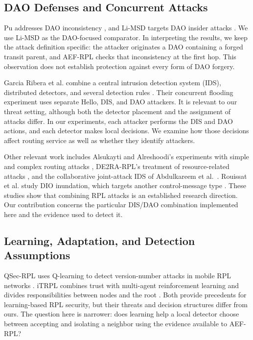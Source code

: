 \documentclass[journal]{IEEEtran}
\begin{document}
\subsection{DAO Defenses and Concurrent Attacks}
Pu addresses DAO inconsistency \cite{pu2018}, and Li-MSD targets DAO insider attacks \cite{limsd2024}. We use Li-MSD as the DAO-focused comparator. In interpreting the results, we keep the attack definition specific: the attacker originates a DAO containing a forged transit parent, and AEF-RPL checks that inconsistency at the first hop. This observation does not establish protection against every form of DAO forgery.

Garcia Ribera et al. combine a central intrusion detection system (IDS), distributed detectors, and several detection rules \cite{garciaribera2022}. Their concurrent flooding experiment uses separate Hello, DIS, and DAO attackers. It is relevant to our threat setting, although both the detector placement and the assignment of attacks differ. In our experiments, each attacker performs the DIS and DAO actions, and each detector makes local decisions. We examine how those decisions affect routing service as well as whether they identify attackers.

Other relevant work includes Alsukayti and Alreshoodi's experiments with simple and complex routing attacks \cite{alsukayti2023}, DE2RA-RPL's treatment of resource-related attacks \cite{de2rarpl2024}, and the collaborative joint-attack IDS of Abdulkareem et al.\ \cite{abdulkareem2024}. Rouissat et al. study DIO inundation, which targets another control-message type \cite{rouissat2023}. These studies show that combining RPL attacks is an established research direction. Our contribution concerns the particular DIS/DAO combination implemented here and the evidence used to detect it.

\subsection{Learning, Adaptation, and Detection Assumptions}
QSec-RPL uses Q-learning to detect version-number attacks in mobile RPL networks \cite{qsecrpl2023}. iTRPL combines trust with multi-agent reinforcement learning and divides responsibilities between nodes and the root \cite{itrpl2024}. Both provide precedents for learning-based RPL security, but their threats and decision structures differ from ours. The question here is narrower: does learning help a local detector choose between accepting and isolating a neighbor using the evidence available to AEF-RPL?
\end{document}
